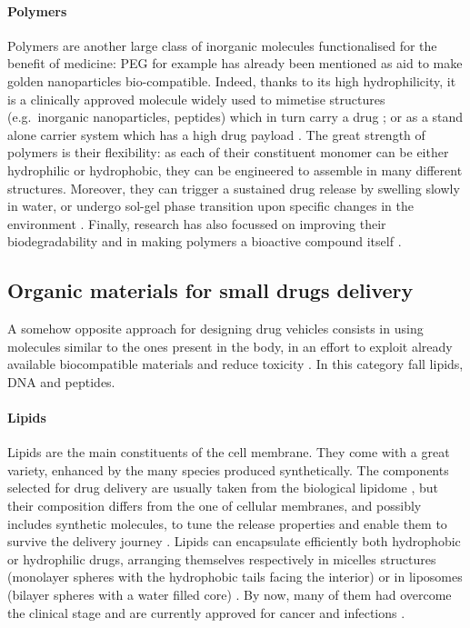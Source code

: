 \paragraph{Polymers} Polymers are another large class of inorganic molecules functionalised for the benefit of medicine: PEG for example has already been mentioned as aid to make golden nanoparticles bio-compatible. Indeed, thanks to its high hydrophilicity, it is a clinically approved molecule widely used to mimetise structures (e.g.\ inorganic nanoparticles, peptides) which in turn carry a drug \cite{Lammers2009}; or as a stand alone carrier system which has a high drug payload \cite{Liechty2010}. The great strength of polymers is their flexibility: as each of their constituent monomer can be either hydrophilic or hydrophobic, they can be engineered to assemble in many different structures\cite{Kawakatsu2004}. Moreover, they can trigger a sustained drug release by swelling slowly in water,\cite{Nicolas2013} or undergo sol-gel phase transition upon specific changes in the environment \cite{Liechty2010}. Finally, research has also focussed on improving their biodegradability \cite{Nair2007} and in making polymers a bioactive compound itself \cite{Rao2018}.


\subsection{Organic materials for small drugs delivery} \label{sec:organic}

A somehow opposite approach for designing drug vehicles consists in using molecules similar to the ones present in the body, in an effort to exploit already available biocompatible materials and reduce toxicity \cite{Yoo2011}. In this category fall lipids, DNA and peptides.

\paragraph{Lipids} Lipids are the main constituents of the cell membrane. They come with a great variety, enhanced by the many species produced synthetically. The components selected for drug delivery are usually taken from the biological lipidome \cite{seeRebuttal}, but their composition differs from the one of cellular membranes, and possibly includes synthetic molecules, to tune the release properties and enable them to survive the delivery journey \cite{Yingchoncharoen2016}. Lipids can encapsulate efficiently both hydrophobic or hydrophilic drugs, arranging themselves respectively in micelles structures (monolayer spheres with the hydrophobic tails facing the interior) or in liposomes (bilayer spheres with a water filled core) \cite{Bunker2016}. By now, many of them had overcome the clinical stage and are currently approved for cancer and infections \cite{Pattni2015paper, Jain2017}.


